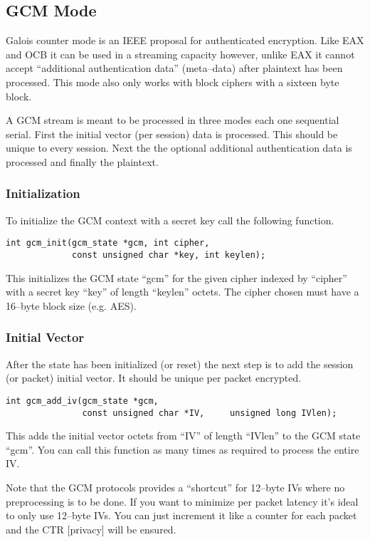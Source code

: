 \documentclass[a4paper]{book}
\begin{document}
\subsection{GCM Mode}
Galois counter mode is an IEEE proposal for authenticated encryption.  Like EAX and OCB it can be used in a streaming capacity however, unlike EAX it cannot
accept ``additional authentication data'' (meta--data) after plaintext has been processed.  This mode also only works with block ciphers with a sixteen
byte block.

A GCM stream is meant to be processed in three modes each one sequential serial.  First the initial vector (per session) data is processed.  This should be 
unique to every session.  Next the the optional additional authentication data is processed and finally the plaintext.  

\subsubsection{Initialization}
To initialize the GCM context with a secret key call the following function.

\begin{verbatim}
int gcm_init(gcm_state *gcm, int cipher,
             const unsigned char *key, int keylen);
\end{verbatim}
This initializes the GCM state ``gcm'' for the given cipher indexed by ``cipher'' with a secret key ``key'' of length ``keylen'' octets.  The cipher chosen
must have a 16--byte block size (e.g. AES).  

\subsubsection{Initial Vector}
After the state has been initialized (or reset) the next step is to add the session (or packet) initial vector.  It should be unique per packet encrypted.

\begin{verbatim}
int gcm_add_iv(gcm_state *gcm, 
               const unsigned char *IV,     unsigned long IVlen);
\end{verbatim}

This adds the initial vector octets from ``IV'' of length ``IVlen'' to the GCM state ``gcm''.  You can call this function as many times as required
to process the entire IV.  

Note that the GCM protocols provides a ``shortcut'' for 12--byte IVs where no preprocessing is to be done.  If you want to minimize per packet latency it's ideal
to only use 12--byte IVs.  You can just increment it like a counter for each packet and the CTR [privacy] will be ensured.
\end{document}
